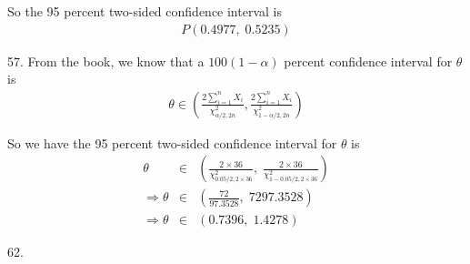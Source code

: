 \documentclass[12pt]{article}
\begin{document}
So the 95 percent two-sided confidence interval is
\begin{eqnarray*}
  P \left(0.4977, \; 0.5235 \right)
\end{eqnarray*}

57. From the book, we know that a $100(1 - \alpha)$ percent confidence interval for $\theta$ is
\begin{eqnarray*}
  \theta \in \left(
    \frac {2 \sum_{i=1}^n X_i}{\chi_{\alpha / 2, 2n}^2}
    , \frac{2 \sum_{i=1}^n X_i}{\chi_{1-\alpha / 2, 2n}^2} \right)
\end{eqnarray*}

So we have the 95 percent two-sided confidence interval for $\theta$ is
\begin{eqnarray*}
  \theta &\in& \left(
    \frac {2 \times 36}{\chi_{0.05 / 2, 2 \times 36}^2}
    , \; \frac {2 \times 36}{\chi_{1-0.05 / 2, 2\times 36}^2} \right) \\
  \Rightarrow \theta  &\in& \left( \frac {72}{97.3528},
    \; {72}{97.3528} \right) \\
    \Rightarrow \theta  &\in& \left( 0.7396, \; 1.4278 \right)
\end{eqnarray*}

62. \\
\end{document}
